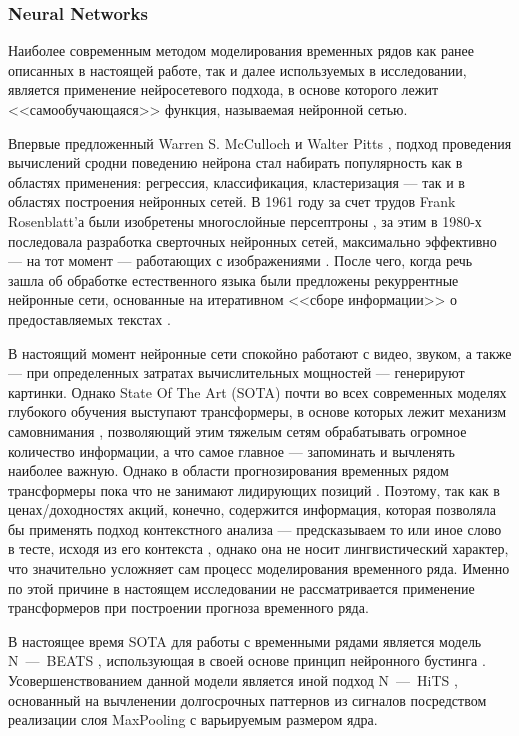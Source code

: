 \subsubsection{Neural Networks} \label{link::neural_networks}
Наиболее современным методом моделирования временных рядов как ранее описанных в настоящей работе, так и далее используемых в исследовании, является применение нейросетевого подхода, в основе которого лежит <<самообучающаяся>> функция, называемая нейронной сетью. 

Впервые предложенный Warren S. McCulloch и Walter Pitts \cite{mcculloch1943logical}, подход проведения вычислений сродни поведению нейрона стал набирать популярность как в областях применения: регрессия, классификация, кластеризация --- так и в областях построения нейронных сетей. В 1961 году за счет трудов Frank Rosenblatt'а были изобретены многослойные персептроны \cite{rosenblatt1961principles}, за этим в 1980-х последовала разработка сверточных нейронных сетей, максимально эффективно --- на тот момент --- работающих с изображениями \cite{lecun1989backpropagation, lecun2015deep, lecun1989generalization}. После чего, когда речь зашла об обработке естественного языка были предложены рекуррентные нейронные сети, основанные на итеративном <<сборе информации>> о предоставляемых текстах \cite{hochreiter1997long, rumelhart1986learning}. 

В настоящий момент нейронные сети спокойно работают с видео, звуком, а также --- при определенных затратах вычислительных мощностей --- генерируют картинки. Однако State Of The Art (SOTA) почти во всех современных моделях глубокого обучения выступают трансформеры, в основе которых лежит механизм самовнимания \cite{attention_transformers}, позволяющий этим тяжелым сетям обрабатывать огромное количество информации, а что самое главное --- запоминать и вычленять наиболее важную. Однако в области прогнозирования временных рядом трансформеры пока что не занимают лидирующих позиций \cite{transformers_are_useless_for_TSF}.  Поэтому, так как в ценах/доходностях акций, конечно, содержится информация, которая позволяла бы применять подход контекстного анализа --- предсказываем то или иное слово в тесте, исходя из его контекста \cite{word2vec_2013}, однако она не носит лингвистический характер, что значительно усложняет сам процесс моделирования временного ряда. Именно по этой причине в настоящем исследовании не рассматривается применение трансформеров при построении прогноза временного ряда.

В настоящее время SOTA для работы с временными рядами является модель N~---~BEATS \cite{oreshkin2019n}, использующая в своей основе принцип нейронного бустинга \cite{schapire2003boosting}. Усовершенствованием данной модели является иной подход N~---~HiTS \cite{challu2022n}, основанный на вычленении долгосрочных паттернов из сигналов посредством реализации слоя MaxPooling с варьируемым размером ядра.

